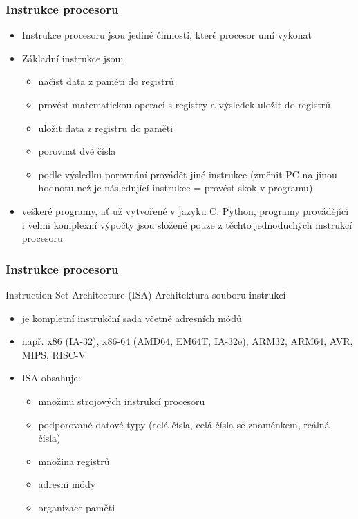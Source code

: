\documentclass{beamer}
\begin{document}
\begin{frame}
\frametitle{Instrukce procesoru}

\begin{itemize}
\item Instrukce procesoru jsou jediné činnosti, které procesor umí vykonat
\item Základní instrukce jsou:
\begin{itemize}
\item načíst data z paměti do registrů
\item provést matematickou operaci s registry a výsledek uložit do registrů
\item uložit data z registru do paměti
\item porovnat dvě čísla
\item podle výsledku porovnání provádět jiné instrukce (změnit PC na jinou hodnotu než je následující instrukce = provést skok v programu)
\end{itemize}
\item veškeré programy, ať už vytvořené v jazyku C, Python, programy provádějící i velmi komplexní výpočty jsou složené pouze z těchto jednoduchých instrukcí procesoru
\end{itemize}

\end{frame}

\begin{frame}
\frametitle{Instrukce procesoru}

Instruction Set Architecture (ISA) Architektura souboru instrukcí
\begin{itemize}
\item je kompletní instrukční sada včetně adresních módů
\item např. x86 (IA-32), x86-64 (AMD64, EM64T, IA-32e), ARM32, ARM64, AVR, MIPS, RISC-V
\item ISA obsahuje:
\begin{itemize}
\item množinu strojových instrukcí procesoru
\item podporované datové typy (celá čísla, celá čísla se znaménkem, reálná čísla)
\item množina registrů
\item adresní módy
\item organizace paměti
\end{itemize}
\end{itemize}

\end{frame}
\end{document}
